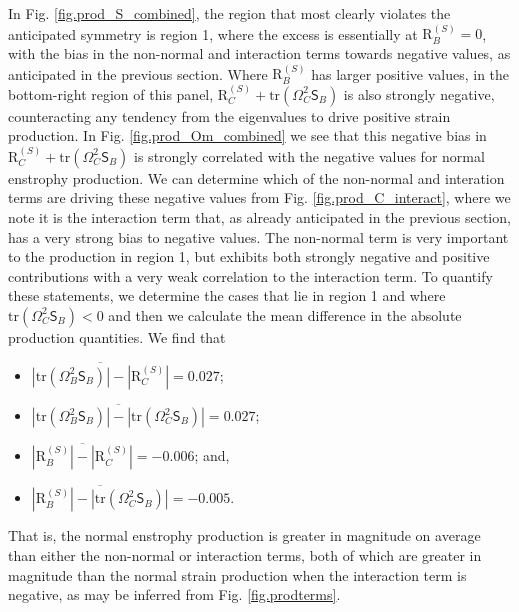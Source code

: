 \documentclass[preprint,amssymb,amsmath,aip,cha]{revtex4-1}
\begin{document}
In Fig. \ref{fig.prod_S_combined}, the region that most clearly violates the anticipated symmetry is region 1, where the excess is essentially at $\mbox{R}_{B}^{(S)} = 0$, with the bias in the non-normal and interaction terms towards negative values, as anticipated in the previous section. Where $\mbox{R}_{B}^{(S)}$ has larger positive values, in the bottom-right region of this panel, $\mbox{R}_{C}^{(S)} + \mbox{tr}(\mathsf{\Omega}^{2}_{C}\mathsf{S}_{B})$ is also strongly negative, counteracting any tendency from the eigenvalues to drive positive strain production. In Fig. \ref{fig.prod_Om_combined} we see that this negative bias in 
$\mbox{R}_{C}^{(S)} + \mbox{tr}(\mathsf{\Omega}^{2}_{C}\mathsf{S}_{B})$ is strongly correlated with the negative values for normal enstrophy production. We can determine which of the non-normal and interation terms are driving these negative values from Fig. \ref{fig.prod_C_interact}, where we note it is the interaction term that, as already anticipated in the previous section, has a very strong bias to negative values. The non-normal term is very important to the production in region 1, but exhibits both strongly negative and positive contributions with a very weak correlation to the interaction term. To quantify these statements, we determine the cases that lie in region 1 and where $\mbox{tr}(\mathsf{\Omega}^{2}_{C}\mathsf{S}_{B}) < 0$ and then we calculate the mean difference in the absolute production quantities. We find that 
\begin{itemize}
\item $\overline{|\mbox{tr}(\mathsf{\Omega}^{2}_{B}\mathsf{S}_{B})| - |\mbox{R}_{C}^{(S)}|} = 0.027$;
\item $\overline{|\mbox{tr}(\mathsf{\Omega}^{2}_{B}\mathsf{S}_{B})| - |\mbox{tr}(\mathsf{\Omega}^{2}_{C}\mathsf{S}_{B})|} = 0.027$; 
\item $\overline{|\mbox{R}_{B}^{(S)}| - |\mbox{R}_{C}^{(S)}|} = -0.006$; and, 
\item $\overline{|\mbox{R}_{B}^{(S)}| - |\mbox{tr}(\mathsf{\Omega}^{2}_{C}\mathsf{S}_{B})|} = -0.005$.
\end{itemize}
That is, the normal enstrophy production is greater in magnitude on average than either the non-normal or interaction terms, both of which are greater in magnitude than the normal strain production when the interaction term is negative, as may be inferred from Fig. \ref{fig.prodterms}.
\end{document}
